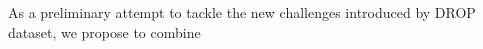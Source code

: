 As a preliminary attempt to tackle the new challenges introduced by DROP dataset, we propose to combine 